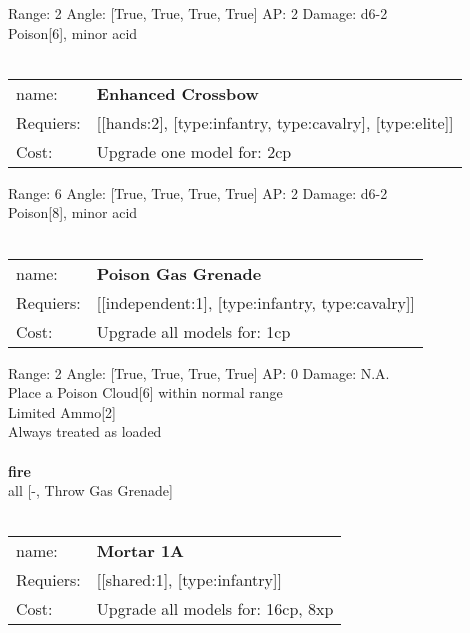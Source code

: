 Range: 2  Angle: [True, True, True, True] AP: 2 Damage: d6-2 \\
Poison[6], minor acid\\ 








\ \\
\begin{tabular}{ll}
name: & {\bf Enhanced Crossbow } \\
Requiers: & [[hands:2], [type:infantry, type:cavalry], [type:elite]] \\
Cost: & Upgrade one model for: 2cp \\
\end{tabular}



Range: 6  Angle: [True, True, True, True] AP: 2 Damage: d6-2 \\
Poison[8], minor acid\\ 








\ \\
\begin{tabular}{ll}
name: & {\bf Poison Gas Grenade } \\
Requiers: & [[independent:1], [type:infantry, type:cavalry]] \\
Cost: & Upgrade all models for: 1cp \\
\end{tabular}



Range: 2  Angle: [True, True, True, True] AP: 0 Damage: N.A. \\
Place a Poison Cloud[6] within normal range\\ 
Limited Ammo[2]\\ 
Always treated as loaded\\ 







\ \\ {\bf fire } \\
all [-, Throw Gas Grenade] \\

\ \\
\begin{tabular}{ll}
name: & {\bf Mortar 1A } \\
Requiers: & [[shared:1], [type:infantry]] \\
Cost: & Upgrade all models for: 16cp, 8xp \\
\end{tabular}



